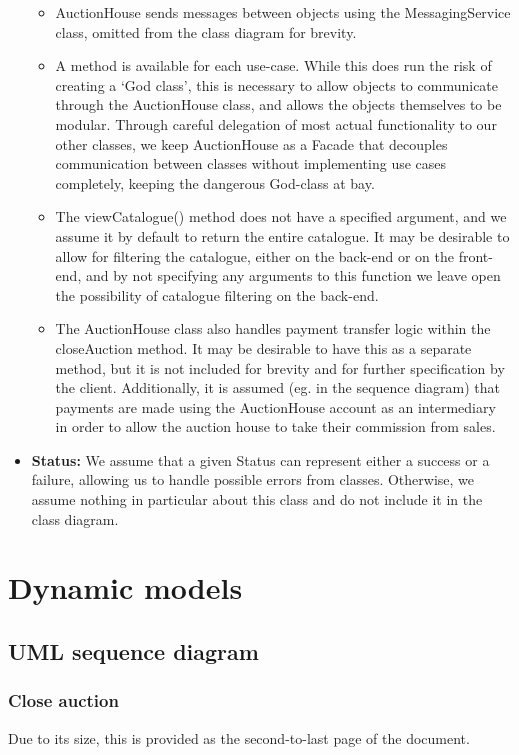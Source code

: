 \documentclass[titlepage, 12pt]{extarticle}
\begin{document}
\begin{itemize}
\begin{itemize}
    \item AuctionHouse sends messages between objects using the MessagingService class, omitted from the class diagram for brevity.
    \item A method is available for each use-case. While this does run the risk of creating a `God class', this is necessary to allow objects to communicate through the AuctionHouse class, and allows the objects themselves to be modular. Through careful delegation of most actual functionality to our other classes, we keep AuctionHouse as a Facade that decouples communication between classes without implementing use cases completely, keeping the dangerous God-class at bay.
    \item The viewCatalogue() method does not have a specified argument, and we assume it by default to return the entire catalogue. It may be desirable to allow for filtering the catalogue, either on the back-end or on the front-end, and by not specifying any arguments to this function we leave open the possibility of catalogue filtering on the back-end. 
    \item The AuctionHouse class also handles payment transfer logic within the closeAuction method. It may be desirable to have this as a separate method, but it is not included for brevity and for further specification by the client. Additionally, it is assumed (eg. in the sequence diagram) that payments are made using the AuctionHouse account as an intermediary in order to allow the auction house to take their commission from sales.
  \end{itemize}
\item {\bf Status: } We assume that a given Status can represent either a success or a failure, allowing us to handle possible errors from classes. Otherwise, we assume nothing in particular about this class and do not include it in the class diagram. 
\end{itemize}
\section{Dynamic models}
\subsection{UML sequence diagram}
\subsubsection{Close auction}
Due to its size, this is provided as the second-to-last page of the document.
\end{document}
